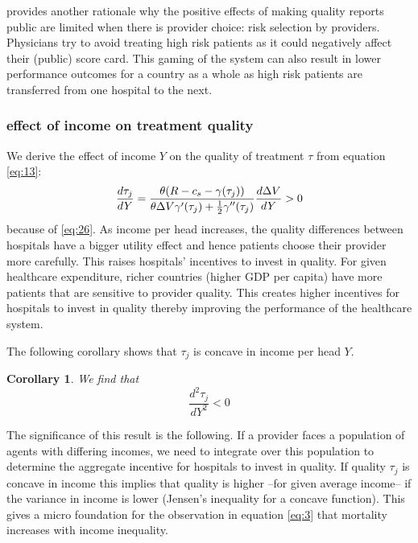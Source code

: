 \documentclass[a4paper,12pt]{article}
\newtheorem{corollary}{Corollary}
\begin{document}
\cite{dranoveReportCards2003} provides another rationale why the positive effects of making quality reports public are limited when there is provider choice: risk selection by providers. Physicians try to avoid treating high risk patients as it could negatively affect their (public) score card. This gaming of the system can also result in lower performance outcomes for a country as a whole as high risk patients are transferred from one hospital to the next.

\subsubsection{effect of income on treatment quality}
\label{sec:orga63c11b}

We derive the effect of income \(Y\) on the quality of treatment \(\tau\) from equation \eqref{eq:13}: 
\begin{equation}
\label{eq:29}
\frac{d\tau_j}{dY} = \frac{\theta (R-c_s-\gamma(\tau_j))}{\theta \Delta V \gamma'(\tau_j) + \textstyle{1\over 2} \gamma''(\tau_j) } \frac{d\Delta V}{dY} > 0
\end{equation}
because of \eqref{eq:26}. As income per head increases, the quality differences between hospitals have a bigger utility effect and hence patients choose their provider more carefully. This raises hospitals' incentives to invest in quality. For given healthcare expenditure, richer countries (higher GDP per capita) have more patients that are sensitive to provider quality. This creates higher incentives for hospitals to invest in quality thereby improving the performance of the healthcare system.

The following corollary shows that \(\tau_j\) is concave in income per head \(Y\).

\begin{corollary}
\label{cor:tauY}
We find that
\begin{equation}
\label{eq:23}
\frac{d^2 \tau_j}{dY^2} < 0
\end{equation}
\end{corollary}

The significance of this result is the following. If a provider faces a population of agents with differing incomes, we need to integrate over this population to determine the aggregate incentive for hospitals to invest in quality. If quality \(\tau_j\) is concave in income this implies that quality is higher --for given average income-- if the variance in income is lower (Jensen's inequality for a concave function). This gives a micro foundation for the observation in equation \eqref{eq:3} that mortality increases with income inequality.
\end{document}
